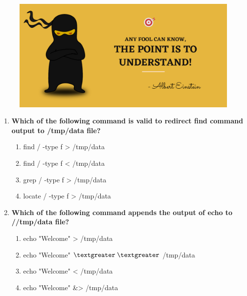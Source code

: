 \setlength{\columnsep}{3pt}
\begin{flushleft}
	
	\paragraph{}
	\bigskip
	
	\begin{figure}[h!]
		\centering
		\includegraphics[scale=.2]{content/practise.jpg}
	\end{figure}	
	\begin{enumerate}
		\item \textbf{Which of the following command is valid to redirect find command output to \textbf{/tmp/data} file?}
		\begin{enumerate}[label=(\alph*)]
			\item find / -type f > /tmp/data   %
			\item find / -type f < /tmp/data   
			\item grep / -type f > /tmp/data   
			\item locate / -type f > /tmp/data
		\end{enumerate}
		\bigskip
		\bigskip	
		
		\item \textbf{Which of the following command appends the output of \textbf{echo} to /\textbf{/tmp/data} file?}
		\begin{enumerate}[label=(\alph*)]
			\item echo "Welcome" > /tmp/data
			\item echo "Welcome" {$\textgreater$}{$\textgreater$} /tmp/data  %
			\item echo "Welcome" < /tmp/data
			\item echo "Welcome" \&> /tmp/data
		\end{enumerate}
		\bigskip
		\bigskip
		

\end{enumerate}
\end{flushleft}
